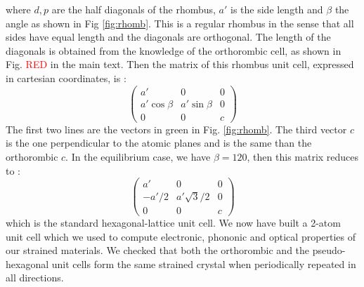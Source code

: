 where $d,p$ are the half diagonals of the rhombus, $a'$ is the side length and $\beta$ the angle as shown in Fig \ref{fig:rhomb}. This is a regular rhombus in the sense that all sides have equal length and the diagonals are orthogonal. The length of the diagonals is obtained from the knowledge of the orthorombic cell, as shown in Fig. \textcolor{red}{RED} in the main text.
Then the matrix of this rhombus unit cell, expressed in cartesian coordinates, is :
\begin{equation}
\begin{pmatrix}
a' & 0 & 0\\
a'\cos\beta & a'\sin\beta & 0\\
0 & 0 & c
\end{pmatrix}
\end{equation}
The first two lines are the vectors in green in Fig. \ref{fig:rhomb}. The third vector $c$ is the one perpendicular to the atomic planes and is the same than the orthorombic $c$.
In the equilibrium case, we have $\beta = 120$\textdegree, then this matrix reduces to :
\begin{equation}
\begin{pmatrix}
a' & 0 & 0\\
-a'/2 & a'\sqrt{3}/2 & 0\\
0 & 0 & c
\end{pmatrix}
\end{equation}
which is the standard hexagonal-lattice unit cell. We now have built a 2-atom unit cell which we used to compute electronic, phononic and optical properties of our strained materials. We checked that both the orthorombic and the pseudo-hexagonal unit cells form the same strained crystal when periodically repeated in all directions.